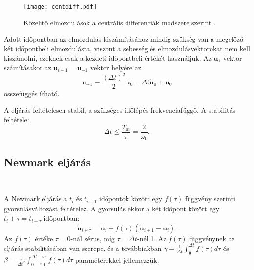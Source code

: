 \begin{figure}[h!]
\centering
\texttt{[image: centdiff.pdf]}
\caption{Közelítő elmozdulások a centrális differenciák módszere szerint \cite{gyorgyi}.}
\label{fig:centdiff}
\end{figure}

Adott időpontban az elmozdulás kiszámításához mindig szükség van a megelőző két időpontbeli elmozdulásra, viszont a sebesség és elmozdulásvektorokat nem kell kiszámolni, ezeknek csak a kezdeti időpontbeli értékét használjuk. Az $\mathbf{u}_1$ vektor számításakor az $\mathbf{u}_{i-1}=\mathbf{u}_{-1}$ vektor helyére az
\begin{displaymath}
\label{u_min1}
\mathbf{u}_{-1}=\frac{(\Delta{t})^2}{2}\mathbf{\ddot{u}}_0-\Delta{t}\mathbf{\dot{u}}_0+\mathbf{u}_0
\end{displaymath}
%
összefüggés írható.

A eljárás feltételesen stabil, a szükséges időlépés frekvenciafüggő. A stabilitás feltétele:
\begin{equation*}
\Delta{t} \leq \frac{T_m}{\pi} = \frac{2}{\omega_0}.
\end{equation*}


\subsection{Newmark eljárás}\label{subsec:Newmark_lin}

{\ }

A Newmark eljárás \cite{gyorgyi} a $t_i$ és $t_{i+1}$ időpontok között egy $f(\tau)$ függvény szerinti gyorsulásváltozást feltételez. A gyorsulás ekkor a két időpont között egy $t_i+\tau = t_{i+\tau}$ időpontban:
\begin{equation*}
\mathbf{\ddot{u}}_{i+\tau} = \mathbf{\ddot{u}}_i+f(\tau)(\mathbf{\ddot{u}}_{i+1}-\mathbf{\ddot{u}}_i).
\end{equation*}
Az $f(\tau)$ értéke $\tau = 0$-nál zérus, míg $\tau = \Delta{t}$-nél 1. Az $f(\tau)$ függvénynek az eljárás stabilitásában van szerepe, és a továbbiakban $\gamma = \frac{1}{\Delta{t}}\int_0^{\Delta{t}}f(\tau)d\tau$ és $\beta = \frac{1}{\Delta{t}^2}\int_0^{\Delta{t}}\int_0^{\tau}f(\tau)d\tau$ paraméterekkel jellemezzük. 


